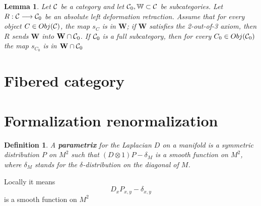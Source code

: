 \documentclass[11pt]{article}
\newtheorem{lemma}[thm]{Lemma}
\newtheorem{dfn}[thm]{Definition}
\newcommand{\calc}{{\cal C}}
\newcommand{\lrta}{\longrightarrow}
\begin{document}
\begin{lemma}
Let $\calc$ be a category and let $\calc_0, \mathbb{W}\subset \calc$ be subcategories. Let $R:\calc\lrta \calc_0$ be an absolute left deformation retraction. Assume that for every object $C\in Obj(\calc)$, the map $s_C$ is in $\mathbf{W}$; if $\mathbf{W}$ satisfies the 2-out-of-3 axiom, then $R$ sends $\mathbf{W}$ into $\mathbf{W}\cap \calc_0$. If $\calc_0$ is a full subcategory, then for every $C_0\in Obj(\calc_0)$ the map $s_{C_0}$ is in $\mathbf{W}\cap \calc_0$
\end{lemma}
\section{Fibered category}
\section{Formalization renormalization}
\begin{dfn}
A \textbf{parametrix} for the Laplacian $D$ on a manifold is a symmetric distribution $P$ on $M^2$ such that $(D\otimes 1)P-\delta_M$ is a smooth function on $M^2$, where $\delta_M$ stands for the $\delta$-distribution on the diagonal of $M$.
\end{dfn}
Locally it means
$$
D_x P_{x,y}-\delta_{x,y}
$$
is a smooth function on $M^2$
\end{document}
